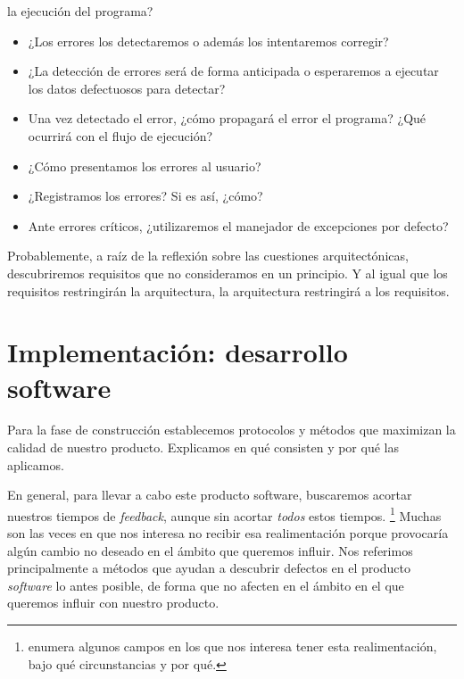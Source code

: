 \begin{enumerate}
          la ejecución del programa?
        \begin{itemize}[noitemsep,nolistsep]
            \item ¿Los errores los detectaremos o además los intentaremos corregir?
            \item ¿La detección de errores será de forma anticipada o esperaremos a ejecutar
                  los datos defectuosos para detectar?
            \item Una vez detectado el error, ¿cómo propagará el error el programa? ¿Qué ocurrirá
                  con el flujo de ejecución?
            \item ¿Cómo presentamos los errores al usuario?
            \item ¿Registramos los errores? Si es así, ¿cómo?
            \item Ante errores críticos, ¿utilizaremos el manejador de excepciones por defecto?
        \end{itemize}
\end{enumerate}

Probablemente, a raíz de la reflexión sobre las cuestiones arquitectónicas, descubriremos
requisitos que no consideramos en un principio. Y al igual que los requisitos restringirán la arquitectura, la arquitectura
restringirá a los requisitos.


\section{Implementación: desarrollo software}

Para la fase de construcción establecemos protocolos y métodos que maximizan
la calidad de nuestro producto. Explicamos en qué consisten y por qué las
aplicamos.

En general, para llevar a cabo este producto software, buscaremos acortar nuestros
tiempos de \textit{feedback}, aunque sin acortar \textit{todos} estos tiempos.%
\footnote{%
    \cite[Chapter 5: Feedback]{ModernSoftwareEngineering} enumera algunos campos en los
    que nos interesa tener esta realimentación, bajo qué circunstancias y por qué.
}%
 Muchas son las
veces en que nos interesa no recibir esa realimentación porque provocaría
algún cambio no deseado en el ámbito que queremos influir. Nos referimos
principalmente a métodos que ayudan a descubrir defectos en el producto
\textit{software} lo antes posible, de forma que no afecten en el ámbito en el que
queremos influir con nuestro producto.

